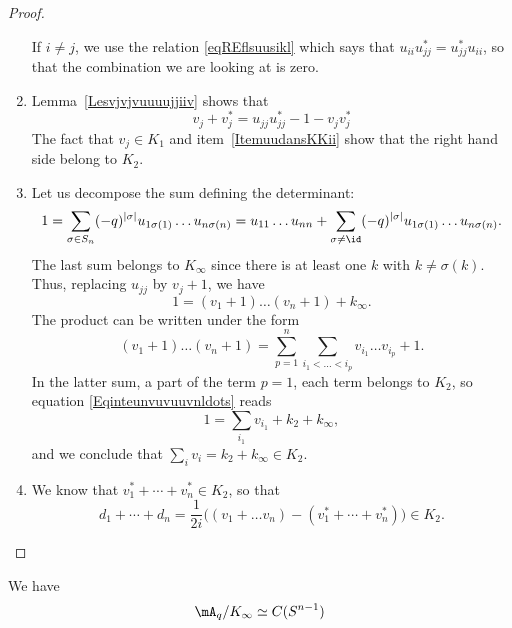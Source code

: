 \begin{proof}
\begin{enumerate}
		      If $i\neq j$, we use the relation \eqref{eqREflsuusikl} which says that $u_{ii}u_{jj}^*=u_{jj}^*u_{ii}$, so that the combination we are looking at is zero.
		\item
		      Lemma~\ref{Lesvjvjvuuuujjiiv} shows that
		      \begin{equation}        \label{Eqvvuiiujjvv}
			      v_j+v_j^*=u_{jj}u_{jj}^*-1-v_jv_j^*
		      \end{equation}
		      The fact that $v_j\in K_1$ and item~\ref{ItemuudansKKii} show that the right hand side belong to $K_2$.
		\item
		      Let us decompose the sum defining the determinant:
		      \begin{equation}
			      1=\sum_{\sigma\in S_n}(-q)^{| \sigma |}u_{1\sigma(1)}\ldots u_{n\sigma(n)}=u_{11}\ldots u_{nn}+\sum_{\sigma\neq \id}(-q)^{| \sigma |}u_{1\sigma(1)}\ldots u_{n\sigma(n)}.
		      \end{equation}
		      The last sum belongs to $K_{\infty}$ since there is at least one $k$ with $k\neq \sigma(k)$. Thus, replacing $u_{jj}$ by $v_j+1$,  we have
		      \begin{equation}        \label{Eqinteunvuvuuvnldots}
			      1=(v_1+1)\ldots (v_n+1)+k_{\infty}.
		      \end{equation}
		      The product can be written under the form
		      \begin{equation}
			      (v_1+1)\ldots(v_n+1)=\sum_{p=1}^n\sum_{i_1<\ldots<i_p}v_{i_1}\ldots v_{i_p}+1.
		      \end{equation}
		      In the latter sum, a part of the term $p=1$, each term belongs to $K_2$, so equation \eqref{Eqinteunvuvuuvnldots} reads
		      \begin{equation}
			      1=\sum_{i_1}v_{i_1}+k_2+k_{\infty},
		      \end{equation}
		      and we conclude that $\sum_iv_i=k_2+k_{\infty}\in K_2$.
		\item
		      We know that $v_1^*+\cdots +v_n^*\in K_2$, so that
		      \begin{equation}
			      d_1+\cdots+ d_n=\frac{1}{ 2i }\big( (v_1+\ldots v_n)-(v_1^*+\cdots +v_n^*) \big)\in K_2.
		      \end{equation}
	\end{enumerate}

\end{proof}

\begin{proposition}
	We have
	\begin{equation}
		\mA_q/K_{\infty}\simeq C(S^{n-1})
	\end{equation}

\end{proposition}

